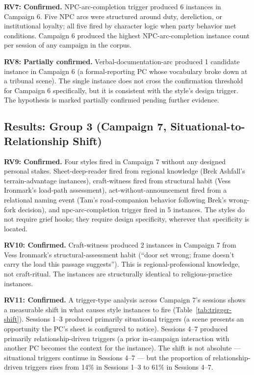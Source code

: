 \textbf{RV7: Confirmed.} NPC-arc-completion trigger produced 6 instances in Campaign 6.
Five NPC arcs were structured around duty, dereliction, or institutional loyalty; all
five fired by character logic when party behavior met conditions. Campaign 6 produced
the highest NPC-arc-completion instance count per session of any campaign in the corpus.

\textbf{RV8: Partially confirmed.} Verbal-documentation-arc produced 1 candidate
instance in Campaign 6 (a formal-reporting PC whose vocabulary broke down at a tribunal
scene). The single instance does not cross the confirmation threshold for Campaign 6
specifically, but it is consistent with the style's design trigger. The hypothesis is
marked partially confirmed pending further evidence.

\subsection{Results: Group 3 (Campaign 7, Situational-to-Relationship Shift)}

\textbf{RV9: Confirmed.} Four styles fired in Campaign 7 without any designed
personal stakes. Sheet-deep-reader fired from regional knowledge (Brek Ashfall's
terrain-advantage instances), craft-witness fired from structural habit (Vess
Ironmark's load-path assessment), act-without-announcement fired from a relational
naming event (Tam's road-companion behavior following Brek's wrong-fork decision),
and npc-arc-completion trigger fired in 5 instances. The styles do not require grief
hooks; they require design specificity, wherever that specificity is located.

\textbf{RV10: Confirmed.} Craft-witness produced 2 instances in Campaign 7 from
Vess Ironmark's structural-assessment habit (``door set wrong; frame doesn't carry
the load this passage suggests''). This is regional-professional knowledge, not
craft-ritual. The instances are structurally identical to religious-practice instances.

\textbf{RV11: Confirmed.} A trigger-type analysis across Campaign 7's sessions
shows a measurable shift in what causes style instances to fire (Table~\ref{tab:trigger-shift}).
Sessions 1--3 produced primarily situational triggers (a scene presents an opportunity
the PC's sheet is configured to notice). Sessions 4--7 produced primarily relationship-driven
triggers (a prior in-campaign interaction with another PC becomes the context for the
instance). The shift is not absolute --- situational triggers continue in Sessions 4--7
--- but the proportion of relationship-driven triggers rises from 14\% in Sessions 1--3
to 61\% in Sessions 4--7.

